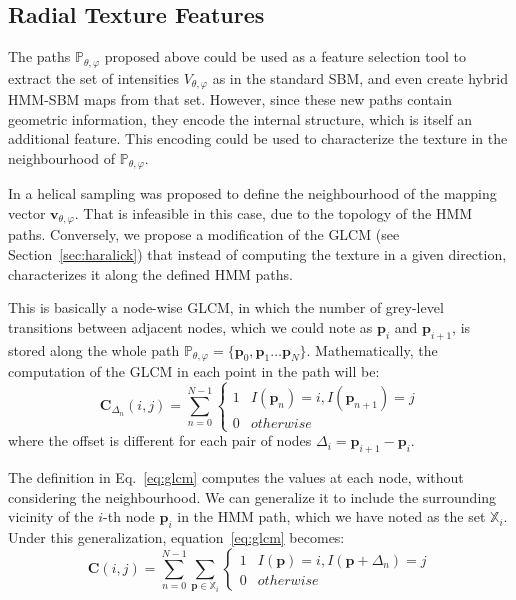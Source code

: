 \subsection{Radial Texture Features}\label{sec:rtextfeat}
The paths $\mathbb{P}_{\theta,\varphi}$ proposed above could be used as a feature selection tool to extract the set of intensities $V_{\theta,\varphi}$ as in the standard \ac{SBM}, and even create hybrid \ac{HMM}-\ac{SBM} maps from that set. However, since these new paths contain geometric information, they encode the internal structure, which is itself an additional feature. This encoding could be used to characterize the texture in the neighbourhood of $\mathbb{P}_{\theta,\varphi}$. 

In \cite{Martinez-MurciaVRLBP} a helical sampling was proposed to define the neighbourhood of the mapping vector $\mathbf{v}_{\theta,\varphi}$. That is infeasible in this case, due to the topology of the \ac{HMM} paths. Conversely, we propose a modification of the \ac{GLCM} (see Section~\ref{sec:haralick}) that instead of computing the texture in a given direction, characterizes it along the defined \ac{HMM} paths. 

This is basically a node-wise \ac{GLCM}, in which the number of grey-level transitions between adjacent nodes, which we could note as $\mathbf{p}_i$ and $\mathbf{p}_{i+1}$, is stored along the whole path $\mathbb{P}_{\theta,\varphi} = \{\mathbf{p}_0, \mathbf{p}_1 \dots \mathbf{p}_N\}$. Mathematically, the computation of the \ac{GLCM} in each point in the path will be: 
\begin{equation}\label{eq:glcm}
\mathbf{C}_{\Delta_n}(i,j) = \sum_{n=0}^{N-1}
\begin{cases}
1 & I(\mathbf{p}_n) = i, I(\mathbf{p}_{n+1})=j\\
0 & otherwise
\end{cases}
\end{equation}
where the offset is different for each pair of nodes $\Delta_i=\mathbf{p}_{i+1}-\mathbf{p}_i$. 

The definition in Eq.~\ref{eq:glcm} computes the values at each node, without considering the neighbourhood. We can generalize it to include the surrounding vicinity of the $i$-th node $\mathbf{p}_i$ in the \ac{HMM} path, which we have noted as the set $\mathbb{X}_i$. Under this generalization, equation~\ref{eq:glcm} becomes: 
\begin{equation}\label{eq:glcmGen}
\mathbf{C}(i,j) = \sum_{n=0}^{N-1} \sum_{\mathbf{p} \in \mathbb{X}_i}
\begin{cases}
1 & I(\mathbf{p}) = i, I(\mathbf{p}+\Delta_n)=j\\
0 & otherwise
\end{cases}
\end{equation}

